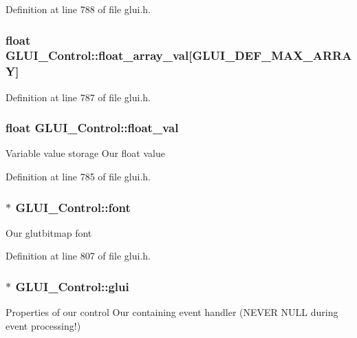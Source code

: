 Definition at line 788 of file glui.\+h.

\hypertarget{class_g_l_u_i___control_a6d2cc0faaa678706939ac775c523871a}{
\subsubsection[{float\+\_\+array\+\_\+val}]{\setlength{\rightskip}{0pt plus 5cm}float G\+L\+U\+I\+\_\+\+Control\+::float\+\_\+array\+\_\+val\mbox{[}{\bf G\+L\+U\+I\+\_\+\+D\+E\+F\+\_\+\+M\+A\+X\+\_\+\+A\+R\+R\+A\+Y}\mbox{]}}}\label{class_g_l_u_i___control_a6d2cc0faaa678706939ac775c523871a}


Definition at line 787 of file glui.\+h.

\hypertarget{class_g_l_u_i___control_ac69b8e62a6f4f16c83b70a64f73d7a1c}{
\subsubsection[{float\+\_\+val}]{\setlength{\rightskip}{0pt plus 5cm}float G\+L\+U\+I\+\_\+\+Control\+::float\+\_\+val}}\label{class_g_l_u_i___control_ac69b8e62a6f4f16c83b70a64f73d7a1c}
Variable value storage Our float value 

Definition at line 785 of file glui.\+h.

\hypertarget{class_g_l_u_i___control_a132273406b5ea6d95cd26501fc2f2027}{
\subsubsection[{font}]{$\ast$ G\+L\+U\+I\+\_\+\+Control\+::font}}\label{class_g_l_u_i___control_a132273406b5ea6d95cd26501fc2f2027}
Our glutbitmap font 

Definition at line 807 of file glui.\+h.

\hypertarget{class_g_l_u_i___control_ac731aebe26d7eb0b916a9692229f0eb6}{
\subsubsection[{glui}]{$\ast$ G\+L\+U\+I\+\_\+\+Control\+::glui}}\label{class_g_l_u_i___control_ac731aebe26d7eb0b916a9692229f0eb6}
Properties of our control Our containing event handler (N\+E\+V\+E\+R N\+U\+L\+L during event processing!) 

